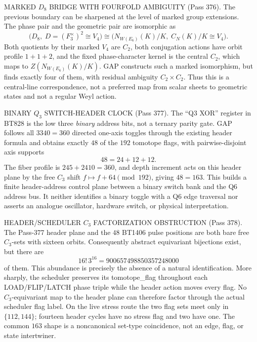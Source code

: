 \documentclass[12pt,a4paper]{article}
\def\mathbb#1{#1}%
\def\textbf#1{#1}%
\def\texttt#1{#1}%
\def\cdot{ }%
\theoremstyle{definition}
\begin{document}
\begin{center}
{{\smallskip
\textbf{MARKED \(D_8\) BRIDGE WITH FOURFOLD AMBIGUITY (Pass 376).}  The
previous boundary can be sharpened at the level of marked group extensions.
The phase pair and the geometric pair are isomorphic as
\[
 \bigl(D_8,\;D=(\mathbb F_3^\times)^2\cong V_4\bigr)
 \cong
 \bigl(N_{W(E_6)}(K)/K,\;C_N(K)/K\cong V_4\bigr).
\]
Both quotients by their marked $V_4$ are $C_2$, both conjugation actions have
orbit profile $1+1+2$, and the fixed phase-character kernel is the central
$C_2$, which maps to $Z(N_{W(E_6)}(K)/K)$.  GAP constructs such a marked
isomorphism, but finds exactly four of them, with residual ambiguity
$C_2\times C_2$.  Thus this is a central-line correspondence, not a preferred
map from scalar sheets to geometric states and not a regular Weyl action.

\smallskip
\textbf{BINARY \(Q_3\) SWITCH-HEADER CLOCK (Pass 377).}  The ``Q3 XOR''
register in BT828 is the low three \emph{binary} address bits, not a ternary
parity gate.  GAP follows all $3\cdot3\cdot40=360$ directed one-axis toggles
through the existing header formula and obtains exactly $48$ of the $192$
tomotope flags, with pairwise-disjoint axis supports
\[
  48=24+12+12.
\]
The fiber profile is $24\cdot5+24\cdot10=360$, and depth increment acts on
this header plane by the free $C_3$ shift $f\mapsto f+64\pmod {192}$, giving
$48=16\cdot3$.  This builds a finite header-address control plane between a
binary switch bank and the Q6 address bus.  It neither identifies a binary
toggle with a Q6 edge traversal nor asserts an analogue oscillator, hardware
switch, or physical interpretation.

\smallskip
\textbf{HEADER/SCHEDULER \(C_3\) FACTORIZATION OBSTRUCTION (Pass 378).}
The Pass-377 header plane and the $48$ BT1406 pulse positions are both bare
free $C_3$-sets with sixteen orbits.  Consequently abstract equivariant
bijections exist, but there are
\[
  16!\,3^{16}=900657498850357248000
\]
of them.  This abundance is precisely the absence of a natural identification.
More sharply, the scheduler preserves its \texttt{tomotope\_flag} throughout
each \texttt{LOAD/FLIP/LATCH} phase triple while the header action moves every
flag.  No $C_3$-equivariant map to the header plane can therefore factor through
the actual scheduler flag label.  On the live stress route the two flag sets
meet only in $\{112,144\}$; fourteen header cycles have no stress flag and two
have one.  The common $16\cdot3$ shape is a noncanonical set-type coincidence,
not an edge, flag, or state intertwiner.

}}
\end{center}
\end{document}
